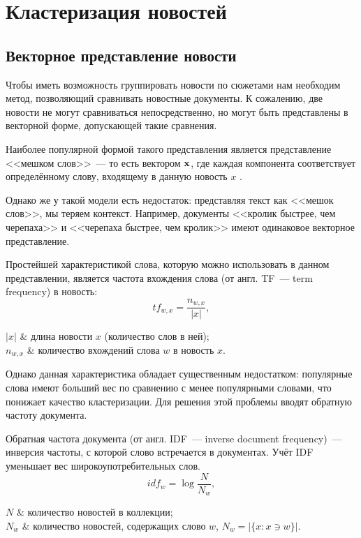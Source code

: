 \section{Кластеризация новостей}
\subsection{Векторное представление новости} \label{ssec:vectorization}
Чтобы иметь возможность группировать новости по сюжетами нам необходим метод, позволяющий сравнивать новостные документы. К сожалению, две новости не могут сравниваться непосредственно, но могут быть представлены в векторной форме, допускающей такие сравнения.

Наиболее популярной формой такого представления является представление <<мешком слов>>~--- то есть вектором $\boldsymbol{\mathbf{x}}$, где каждая компонента соответствует определённому слову, входящему в данную новость $x$ \cite{frakes92}.

Однако же у такой модели есть недостаток: представляя текст как <<мешок слов>>, мы теряем контекст. Например, документы <<кролик быстрее, чем черепаха>> и <<черепаха быстрее, чем кролик>> имеют одинаковое векторное представление.

Простейшей характеристикой слова, которую можно использовать в данном представлении, является частота вхождения слова (от англ. TF~--- term frequency) в новость:
\begin{equation} \label{eq:tf}
    tf_{w,x}=\frac{n_{w,x}}{|x|},
\end{equation}
\begin{conditions}
    $|x|$ & длина новости $x$ (количество слов в ней); \\
    $n_{w,x}$ & количество вхождений слова $w$ в новость $x$. \\
\end{conditions}

Однако данная характеристика обладает существенным недостатком: популярные слова имеют больший вес по сравнению с менее популярными словами, что понижает качество кластеризации. Для решения этой проблемы вводят обратную частоту документа.

Обратная частота документа (от англ. IDF~--- inverse document frequency)~--- инверсия частоты, с которой слово встречается в документах. Учёт IDF уменьшает вес широкоупотребительных слов.
\begin{equation} \label{eq:idf}
    idf_w=\log\frac{N}{N_w},
\end{equation}
\begin{conditions}
    $N$ & количество новостей в коллекции;\\
    $N_w$ & количество новостей, содержащих слово $w$, $N_w=|\{x: x\ni w\}|$.
\end{conditions}

